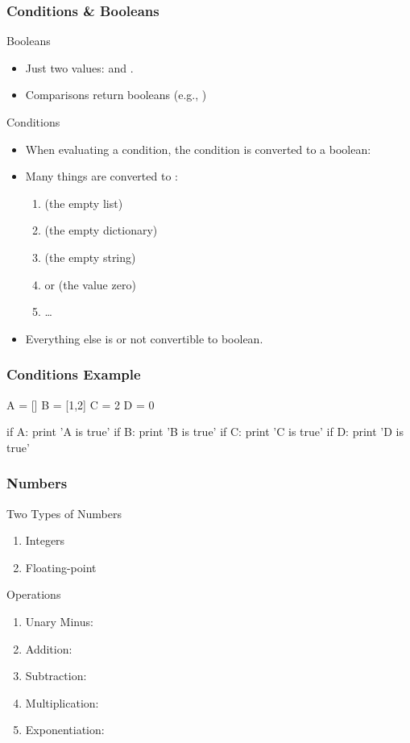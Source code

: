 \begin{frame}[fragile]
\frametitle{Conditions \& Booleans}
\begin{block}{Booleans}
\begin{itemize}
\item Just two values:  and .
\item Comparisons return booleans (e.g., )
\end{itemize}
\end{block}

\begin{block}{Conditions}
\begin{itemize}
\item When evaluating a condition, the condition is converted to a boolean:
\item Many things are converted to :
\begin{enumerate}
\item \code{$[]$} (the empty list)
\item \code{$\{ \}$} (the empty dictionary)
\item {} (the empty string)
\item {} or  (the value zero)
\item \ldots
\end{enumerate}
\item Everything else is  or not convertible to boolean.
\end{itemize}
\end{block}
\end{frame}

\begin{frame}[fragile]
\frametitle{Conditions Example}

\begin{python}
A = []
B = [1,2]
C = 2
D = 0

if A:
    print 'A is true'
if B:
    print 'B is true'
if C:
    print 'C is true'
if D:
    print 'D is true'
\end{python}
\end{frame}

\begin{frame}[fragile]
\frametitle{Numbers}
\begin{block}{Two Types of Numbers}
\begin{enumerate}
\item Integers
\item Floating-point
\end{enumerate}
\end{block}

\begin{block}{Operations}
\begin{enumerate}
\item Unary Minus: 
\item Addition: 
\item Subtraction: 
\item Multiplication: 
\item Exponentiation: 
\end{enumerate}
\end{block}
\end{frame}

